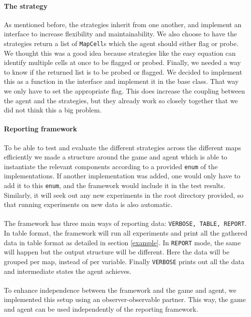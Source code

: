 \documentclass[british]{article}
\newcommand{\code}[1]{\texttt{#1}}
\begin{document}
\paragraph{The strategy} As mentioned before, the strategies inherit from one another, and implement an interface to increase flexibility and maintainability. We also choose to have the strategies return a list of \code{MapCell}s which the agent should either flag or probe. We thought this was a good idea because strategies like the easy equation can identify multiple cells at once to be flagged or probed. Finally, we needed a way to know if the returned list is to be probed or flagged. We decided to implement this as a function in the interface and implement it in the base class. That way we only have to set the appropriate flag. This does increase the coupling between the agent and the strategies, but they already work so closely together that we did not think this a big problem.

\paragraph{Reporting framework} To be able to test and evaluate the different strategies across the different maps efficiently we made a structure around the game and agent which is able to instantiate the relevant components according to a provided \code{enum} of the implementations. If another implementation was added, one would only have to add it to this \code{enum}, and the framework would include it in the test results. Similarly, it will seek out any new experiments in the root directory provided, so that running experiments on new data is also automatic.
\paragraph{} The framework has three main ways of reporting data: \code{VERBOSE, TABLE, REPORT}. In table format, the framework will run all experiments and print all the gathered data in table format as detailed in section \ref{example}. In \code{REPORT} mode, the same will happen but the output structure will be different. Here the data will be grouped per map, instead of per variable. Finally \code{VERBOSE} prints out all the data and intermediate states the agent achieves.
\paragraph{} To enhance independence between the framework and the game and agent, we implemented this setup using an observer-observable partner. This way, the game and agent can be used independently of the reporting framework.
\end{document}
